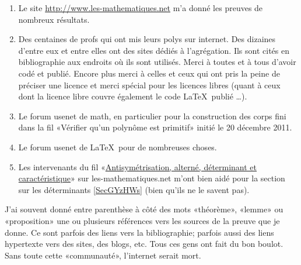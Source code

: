 \begin{enumerate}
    \item
        Le site \url{http://www.les-mathematiques.net} m'a donné les preuves de nombreux résultats.
    \item
        Des centaines de profs qui ont mis leurs polys sur internet. Des dizaines d'entre eux et entre elles ont des sites dédiés à l'agrégation. Ils sont cités en bibliographie aux endroits où ils sont utilisés. Merci à toutes et à tous d'avoir codé et publié. Encore plus merci à celles et ceux qui ont pris la peine de préciser une licence et merci spécial pour les licences libres (quant à ceux dont la licence libre couvre également le code \LaTeX\ publié \ldots).
    \item
        Le forum usenet de math, en particulier pour la construction des corps fini dans la fil «Vérifier qu'un polynôme est primitif» initié le 20 décembre 2011.
    \item
        Le forum usenet de \LaTeX\ pour de nombreuses choses.
    \item
        Les intervenants du fil «\href{http://www.les-mathematiques.net/phorum/read.php?2,302266}{Antisymétrisation, alterné, déterminant et caractéristique}» sur les-mathematiques.net m'ont bien aidé pour la section sur les déterminants \ref{SecGYzHWs} (bien qu'ils ne le savent pas).
\end{enumerate}

J'ai souvent donné entre parenthèse à côté des mots «théorème», «lemme» ou «proposition» une ou plusieurs références vers les sources de la preuve que je donne. Ce sont parfois des liens vers la bibliographie; parfois aussi des liens hypertexte vers des sites, des blogs, etc. Tous ces gens ont fait du bon boulot. Sans toute cette «communauté», l'internet serait mort.

